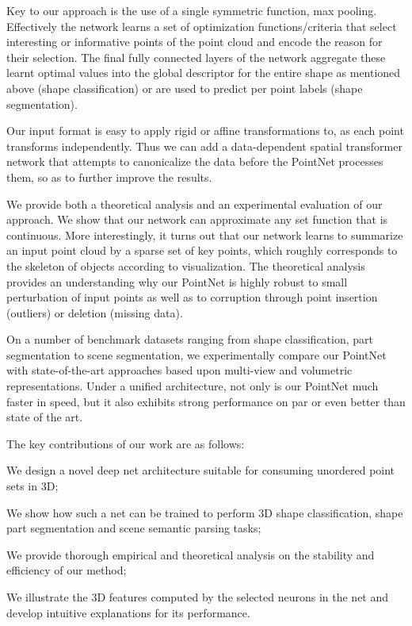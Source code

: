 Key to our approach is the use of a single symmetric function, max pooling. Effectively the network learns a set of optimization functions/criteria that select interesting or informative points of the point cloud and encode the reason for their selection. The final fully connected layers of the network aggregate these learnt optimal values into the global descriptor for the entire shape as mentioned above (shape classification) or are used to predict per point labels (shape segmentation). 

Our input format is easy to apply rigid or affine transformations to, as each point transforms independently. Thus we can add a data-dependent spatial transformer network that attempts to canonicalize the data before the PointNet processes them, so as to further improve the results. 

We provide both a theoretical analysis and an experimental evaluation of our approach. We show that our network can approximate any set function that is continuous. More interestingly, it turns out that our network learns to summarize an input point cloud by a sparse set of key points, which roughly corresponds to the skeleton of objects according to visualization. The theoretical analysis provides an understanding why our PointNet is highly robust to small perturbation of input points as well as to corruption through point insertion (outliers) or deletion (missing data).

On a number of benchmark datasets ranging from shape classification, part segmentation to scene segmentation, we experimentally compare our PointNet with state-of-the-art approaches based upon multi-view and volumetric representations. Under a unified architecture, not only is our PointNet much faster in speed, but it also exhibits strong performance on par or even better than state of the art. 


The key contributions of our work are as follows:
\bitem
\item We design a novel deep net architecture suitable for consuming unordered point sets in 3D;
\item We show how such a net can be trained to perform 3D shape classification, shape part segmentation and scene semantic parsing tasks;
\item We provide thorough empirical and theoretical analysis on the stability and efficiency of our method;
\item We illustrate the 3D features computed by the selected neurons in the net and develop intuitive explanations for its performance.
\eitem

